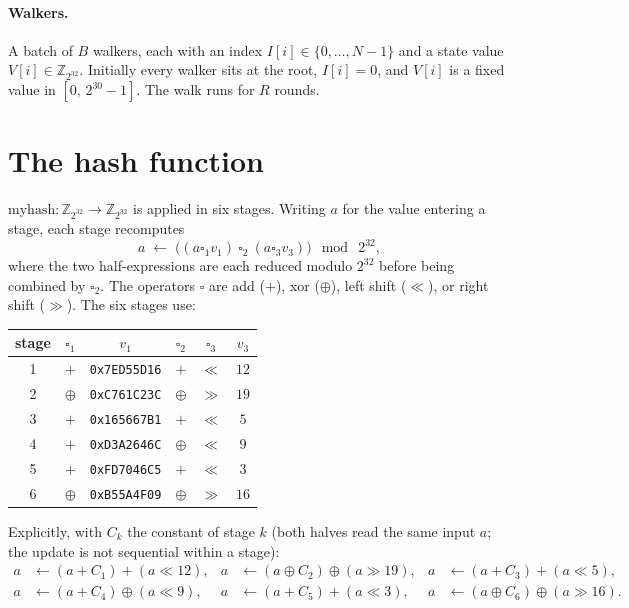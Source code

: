\documentclass[11pt]{article}
\newcommand{\Z}{\mathbb{Z}}
\newcommand{\md}{\bmod\ 2^{32}}
\newcommand{\code}[1]{\texttt{#1}}
\begin{document}
\paragraph{Walkers.} A batch of $B$ walkers, each with an index
$I[i]\in\{0,\dots,N-1\}$ and a state value $V[i]\in\Z_{2^{32}}$. Initially
every walker sits at the root, $I[i]=0$, and $V[i]$ is a fixed value in
$[0,\,2^{30}-1]$. The walk runs for $R$ rounds.

\section{The hash function}

$\mathrm{myhash}:\Z_{2^{32}}\to\Z_{2^{32}}$ is applied in six stages. Writing
$a$ for the value entering a stage, each stage recomputes
\[
  a \;\leftarrow\; \bigl((a \mathbin{\square_1} v_1)\ \square_2\ (a \mathbin{\square_3} v_3)\bigr)\ \md,
\]
where the two half-expressions are each reduced modulo $2^{32}$ before being
combined by $\square_2$. The operators $\square$ are add ($+$), xor
($\oplus$), left shift ($\ll$), or right shift ($\gg$). The six stages use:

\begin{center}
\begin{tabular}{cccccc}
\toprule
stage & $\square_1$ & $v_1$ & $\square_2$ & $\square_3$ & $v_3$ \\
\midrule
1 & $+$      & \code{0x7ED55D16} & $+$      & $\ll$ & $12$ \\
2 & $\oplus$ & \code{0xC761C23C} & $\oplus$ & $\gg$ & $19$ \\
3 & $+$      & \code{0x165667B1} & $+$      & $\ll$ & $5$  \\
4 & $+$      & \code{0xD3A2646C} & $\oplus$ & $\ll$ & $9$  \\
5 & $+$      & \code{0xFD7046C5} & $+$      & $\ll$ & $3$  \\
6 & $\oplus$ & \code{0xB55A4F09} & $\oplus$ & $\gg$ & $16$ \\
\bottomrule
\end{tabular}
\end{center}

Explicitly, with $C_k$ the constant of stage $k$ (both halves read the same
input $a$; the update is not sequential within a stage):
\begin{align*}
  a &\leftarrow (a + C_1) + (a \ll 12), &
  a &\leftarrow (a \oplus C_2) \oplus (a \gg 19), &
  a &\leftarrow (a + C_3) + (a \ll 5), \\
  a &\leftarrow (a + C_4) \oplus (a \ll 9), &
  a &\leftarrow (a + C_5) + (a \ll 3), &
  a &\leftarrow (a \oplus C_6) \oplus (a \gg 16).
\end{align*}
\end{document}
